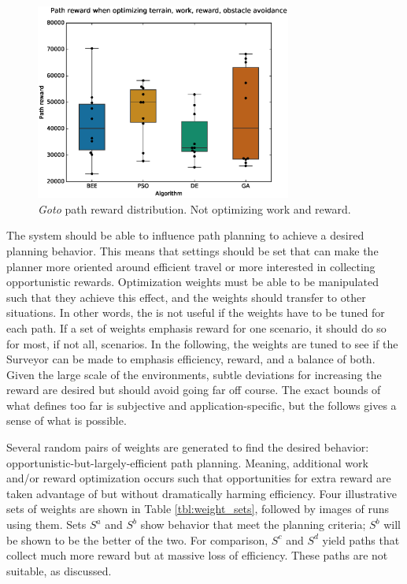 \documentclass{tamuccthesis}
\begin{document}
\begin{figure}
    \captionsetup{justification=centering}
    \centering
    \includegraphics[width=0.75\textwidth,trim={0cm 0.75cm 0cm 0.75cm},clip]{EXP3_histo_reward_b.eps}
    \caption{\textit{Goto} path reward distribution. Not optimizing work and reward. }
    \label{fig:algcompare_b_reward}
\end{figure}


The system should be able to influence path planning to achieve a desired planning behavior. This means that settings should be set that can make the planner more oriented around efficient travel or more interested in collecting opportunistic rewards. Optimization weights must be able to be manipulated such that they achieve this effect, and the weights should transfer to other situations. In other words, the is not useful if the weights have to be tuned for each path. If a set of weights emphasis reward for one scenario, it should do so for most, if not all, scenarios. In the following, the weights are tuned to see if the Surveyor can be made to emphasis efficiency, reward, and a balance of both. Given the large scale of the environments, subtle deviations for increasing the reward are desired but should avoid going far off course. The exact bounds of what defines too far is subjective and application-specific, but the follows gives a sense of what is possible. 

Several random pairs of weights are generated to find the desired behavior: opportunistic-but-largely-efficient path planning. Meaning, additional work and/or reward optimization occurs such that opportunities for extra reward are taken advantage of but without dramatically harming efficiency. Four illustrative sets of weights are shown in Table \ref{tbl:weight_sets}, followed by images of runs using them. Sets $S^a$ and $S^b$ show behavior that meet the planning criteria; $S^b$ will be shown to be the better of the two. For comparison, $S^c$ and $S^d$ yield paths that collect much more reward but at massive loss of efficiency. These paths are not suitable, as discussed. 
\end{document}
